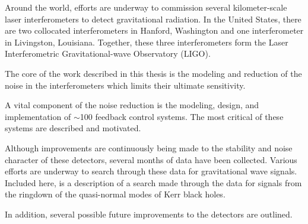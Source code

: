 %             
% 
%

Around the world, efforts are underway to commission several kilometer-scale 
laser interferometers to detect gravitational radiation. In the United States,
there are two collocated interferometers in Hanford, Washington and one interferometer
in Livingston, Louisiana. Together, these three interferometers form the Laser
Interferometric Gravitational-wave Observatory (LIGO). 

The core of the work described in this thesis is the modeling and reduction of
the noise in the interferometers which limits their ultimate sensitivity.

A vital component of the noise reduction is the modeling, design, and implementation
of $\sim$100 feedback control systems. The most critical of these systems
are described and motivated.

Although improvements are continuously being made to the stability and noise character
of these detectors, several months of data have been collected. Various efforts
are underway to search through these data for gravitational wave signals.
Included here, is a description of a search made through the data for signals
from the ringdown of the quasi-normal modes of Kerr black holes.

In addition, several possible future improvements to the detectors are outlined.
